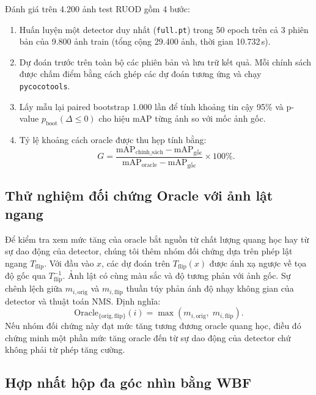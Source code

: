 \documentclass[runningheads]{llncs}
\begin{document}
Đánh giá trên 4.200 ảnh test RUOD gồm 4 bước:
\begin{enumerate}
    \item Huấn luyện một detector duy nhất (\texttt{full.pt}) trong 50 epoch trên cả 3 phiên bản của 9.800 ảnh train (tổng cộng 29.400 ảnh, thời gian 10.732\,s).
    \item Dự đoán trước trên toàn bộ các phiên bản và lưu trữ kết quả. Mỗi chính sách được chấm điểm bằng cách ghép các dự đoán tương ứng và chạy \texttt{pycocotools}.
    \item Lấy mẫu lại paired bootstrap 1.000 lần để tính khoảng tin cậy 95\% và p-value $p_{\text{boot}}(\Delta \le 0)$ cho hiệu mAP từng ảnh so với mốc ảnh gốc.
    \item Tỷ lệ khoảng cách oracle được thu hẹp tính bằng:
          \begin{equation}
              G = \frac{\mathrm{mAP}_{\text{chính\_sách}} - \mathrm{mAP}_{\text{gốc}}}{\mathrm{mAP}_{\mathrm{oracle}} - \mathrm{mAP}_{\text{gốc}}} \times 100\%.
          \end{equation}
\end{enumerate}

\subsection{Thử nghiệm đối chứng Oracle với ảnh lật ngang}
\label{sec:method-noise}

Để kiểm tra xem mức tăng của oracle bắt nguồn từ chất lượng quang học hay từ sự dao động của detector, chúng tôi thêm nhóm đối chứng dựa trên phép lật ngang $T_{\mathrm{flip}}$. Với đầu vào $x$, các dự đoán trên $T_{\mathrm{flip}}(x)$ được ánh xạ ngược về tọa độ gốc qua $T_{\mathrm{flip}}^{-1}$. Ảnh lật có cùng màu sắc và độ tương phản với ảnh gốc. Sự chênh lệch giữa $m_{i, \mathrm{orig}}$ và $m_{i, \mathrm{flip}}$ thuần túy phản ánh độ nhạy không gian của detector và thuật toán NMS. Định nghĩa:
\begin{equation}
    \text{Oracle}_{\{\mathrm{orig}, \mathrm{flip}\}}(i) = \max \left( m_{i, \mathrm{orig}},\; m_{i, \mathrm{flip}} \right).
\end{equation}
Nếu nhóm đối chứng này đạt mức tăng tương đương oracle quang học, điều đó chứng minh một phần mức tăng oracle đến từ sự dao động của detector chứ không phải từ phép tăng cường.

\subsection{Hợp nhất hộp đa góc nhìn bằng WBF}
\label{sec:method-wbf}
\end{document}

